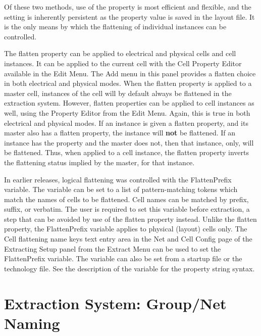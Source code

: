 Of these two methods, use of the property is most efficient and
flexible, and the setting is inherently persistent as the property
value is saved in the layout file.  It is the only means by which the
flattening of individual instances can be controlled.

The {\et flatten} property can be applied to electrical and physical
cells and cell instances.  It can be applied to the current cell with
the {\cb Cell Property Editor} available in the {\cb Edit Menu}.  The
{\cb Add} menu in this panel provides a {\cb flatten} choice in both
electrical and physical modes.  When the {\et flatten} property is
applied to a master cell, instances of the cell will by default always
be flattened in the extraction system.  However, {\et flatten}
properties can be applied to cell instances as well, using the {\cb
Property Editor} from the {\cb Edit Menu}.  Again, this is true in
both electrical and physical modes.  If an instance is given a {\et
flatten} property, and its master also has a {\cb flatten} property,
the instance will {\bf not} be flattened.  If an instance has the
property and the master does not, then that instance, only, will be
flattened.  Thus, when applied to a cell instance, the {\et flatten}
property inverts the flattening status implied by the master, for that
instance.

In earlier {\Xic} releases, logical flattening was controlled with the
{\et FlattenPrefix} variable.  The variable can be set to a list of
pattern-matching tokens which match the names of cells to be
flattened.  Cell names can be matched by prefix, suffix, or verbatim. 
The user is required to set this variable before extraction, a step
that can be avoided by use of the {\et flatten} property instead. 
Unlike the {\et flatten} property, the {\et FlattenPrefix} variable
applies to physical (layout) cells only.  The {\cb Cell flattening
name keys} text entry area in the {\cb Net and Cell Config} page of
the {\cb Extracting Setup} panel from the {\cb Extract Menu} can be
used to set the {\et FlattenPrefix} variable.  The variable can also
be set from a startup file or the technology file.  See the
description of the variable for the property string syntax.


\section{Extraction System:  Group/Net Naming}
\label{netname}

